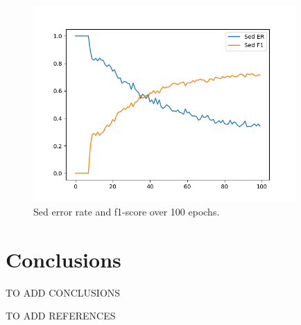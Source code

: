 \documentclass[11pt]{article}
\begin{document}
\begin{figure}[h!]
	\centering
	\includegraphics[width=10cm]{img/er_f1.png}
	\caption{Sed error rate and f1-score over 100 epochs.}
	\label{fig:erf1}
\end{figure}


\newpage
\section{Conclusions}\label{cha:conc}

TO ADD CONCLUSIONS



TO ADD REFERENCES
\end{document}
